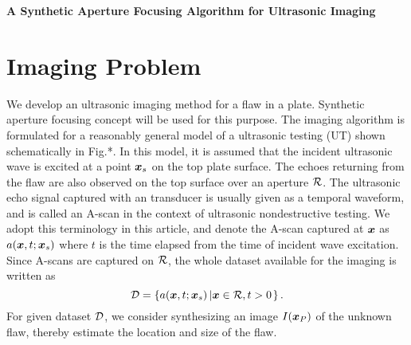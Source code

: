 ﻿\documentclass[11pt,a4j]{article}
\newlength{\minitwocolumn}
\begin{document}
\newcommand{\fat}[1]{\mbox{\boldmath $#1$}}
\newcommand{\D}{\partial}
\newcommand{\w}{\omega}
\newcommand{\ga}{\alpha}
\newcommand{\gb}{\beta}
\newcommand{\gx}{\xi}
\newcommand{\gz}{\zeta}
\newcommand{\vhat}[1]{\hat{\fat{#1}}}
\newcommand{\spc}{\vspace{0.7\baselineskip}}
\newcommand{\halfspc}{\vspace{0.3\baselineskip}}

\newcommand{\twofig}[2]
 {
   \begin{figure}[h]
     \begin{minipage}[t]{\minitwocolumn}
         \begin{center}   #1
         \end{center}
     \end{minipage}
         \hspace{\columnsep}
     \begin{minipage}[t]{\minitwocolumn}
         \begin{center} #2
         \end{center}
     \end{minipage}
   \end{figure}
 }
\begin{center}
{\Large \bf A Synthetic Aperture Focusing Algorithm for Ultrasonic Imaging}
\end{center}
\vspace{10mm}
\section{Imaging Problem}
\hspace{\parindent}
We develop an ultrasonic imaging method for a flaw in a plate.
Synthetic aperture focusing concept will be used for this purpose. 
The imaging algorithm is formulated for a reasonably general model of a 
ultrasonic testing (UT) shown schematically in Fig.*. 
In this model, it is assumed that the incident ultrasonic wave is 
excited at a point $\fat{x}_s$ on the top plate surface.
The echoes returning from the flaw are also observed on the top surface 
over an aperture $\cal R$.
The ultrasonic echo signal captured with an transducer is usually given as a temporal 
 waveform, and is called an A-scan in the context of ultrasonic nondestructive testing.
We adopt this terminology in this article, and denote the A-scan captured 
at $\fat{x}$ as $a(\fat{x},t;\fat{x}_s)$ where $t$ is the time elapsed from 
the time of incident wave excitation. 
Since A-scans are captured on $\cal R$, the whole dataset 
 available for the imaging is written as 
\begin{equation}
	{\cal D} = \left\{
		a(\fat{x},t;\fat{x}_s)\left| \fat{x}\in {\cal R},t>0 \right.
	\right\}.
	\label{eqn:bscan_data}
\end{equation}
For given dataset $\cal D$, we consider synthesizing an image $I(\fat{x}_P)$ 
of the unknown flaw, thereby estimate the location and size of the flaw.
\end{document}
